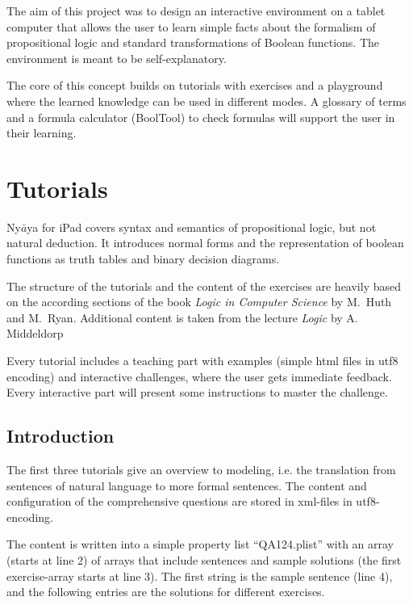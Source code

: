 
The aim of this project was to design an interactive environment on a tablet computer 
that allows the user to learn simple facts about the formalism of propositional logic 
and standard transformations of Boolean functions. 
The environment is meant to be self-explanatory. 

The core of this concept builds on tutorials with exercises 
and a playground where the learned knowledge can be used in different modes. 
A glossary of terms and a formula calculator (BoolTool) to check formulas will support the user in their learning.

\section{Tutorials}

Ny$\bar{a}$ya for iPad covers syntax and semantics of propositional logic, but not natural deduction. 
It introduces normal forms and the representation of boolean functions
as truth tables and binary decision diagrams. 

The structure of the tutorials and the content of the exercises are heavily based on the according sections of the book  
{\em Logic in Computer Science} \cite{Huth:2004:LCS:975331} by M.~Huth and M.~Ryan.
Additional content is taken from the lecture {\em Logic} \cite{Middeldorp:2012:LICS} by {A. Middeldorp}

Every tutorial includes a teaching part with examples (simple html files in utf8 encoding) and interactive challenges, 
where the user gets immediate feedback. Every interactive part will present some instructions to master the challenge.

\subsection{Introduction}

The first three tutorials give an overview to modeling, 
i.e. the translation from sentences of natural language to more formal sentences. 
The content and configuration of the comprehensive questions are stored in xml-files in utf8-encoding. 

The content is written into  a simple property list “QA124.plist”  
with an array (starts at line 2) 
of arrays that include sentences and sample solutions (the first exercise-array starts at line 3). 
The first string is the sample sentence (line 4), 
and the following entries are the solutions for different exercises. 

